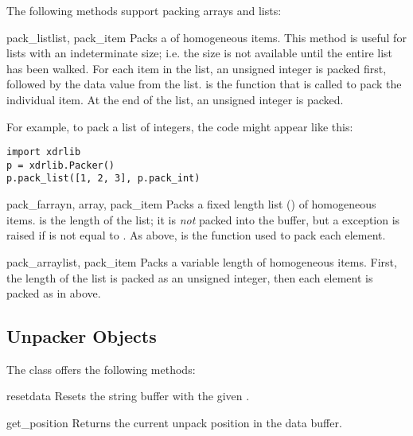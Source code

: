 The following methods support packing arrays and lists:

\begin{methoddesc}[Packer]{pack_list}{list, pack_item}
Packs a  of homogeneous items.  This method is useful for
lists with an indeterminate size; i.e. the size is not available until
the entire list has been walked.  For each item in the list, an
unsigned integer  is packed first, followed by the data value
from the list.   is the function that is called to pack
the individual item.  At the end of the list, an unsigned integer
 is packed.

For example, to pack a list of integers, the code might appear like
this:

\begin{verbatim}
import xdrlib
p = xdrlib.Packer()
p.pack_list([1, 2, 3], p.pack_int)
\end{verbatim}
\end{methoddesc}

\begin{methoddesc}[Packer]{pack_farray}{n, array, pack_item}
Packs a fixed length list () of homogeneous items.  
is the length of the list; it is \emph{not} packed into the buffer,
but a  exception is raised if
 is not equal to .  As above,
 is the function used to pack each element.
\end{methoddesc}

\begin{methoddesc}[Packer]{pack_array}{list, pack_item}
Packs a variable length  of homogeneous items.  First, the
length of the list is packed as an unsigned integer, then each element
is packed as in  above.
\end{methoddesc}


\subsection{Unpacker Objects \label{xdr-unpacker-objects}}

The  class offers the following methods:

\begin{methoddesc}[Unpacker]{reset}{data}
Resets the string buffer with the given .
\end{methoddesc}

\begin{methoddesc}[Unpacker]{get_position}{}
Returns the current unpack position in the data buffer.
\end{methoddesc}

